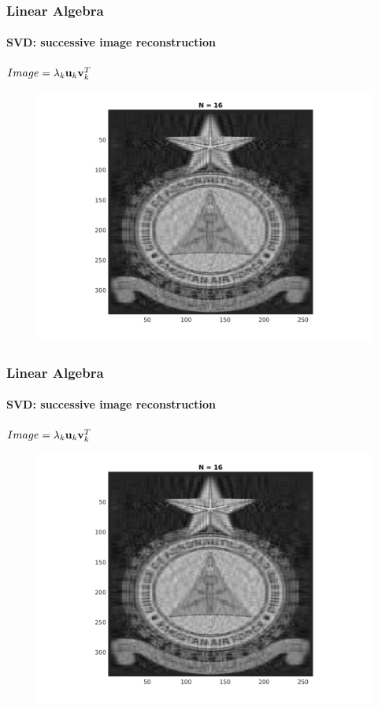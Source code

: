 \documentclass[hyperref={pdfpagelabels=true}]{beamer}
\begin{document}
\begin{frame}
\frametitle{Linear Algebra}
\framesubtitle{SVD: successive image reconstruction} 
\small{
\begin{center}
$Image = \lambda_k{\bf u}_k {\bf v}_k^T$
\end{center}}
\begin{figure}[!htb]
\centering
\includegraphics [scale=0.48]{n/b16.png}
\end{figure}
\end{frame}

\begin{frame}
\frametitle{Linear Algebra}
\framesubtitle{SVD: successive image reconstruction} 
\small{
\begin{center}
$Image = \lambda_k{\bf u}_k {\bf v}_k^T$
\end{center}}
\begin{figure}[!htb]
\centering
\includegraphics [scale=0.48]{n/b16.png}
\end{figure}
\end{frame}
\end{document}
